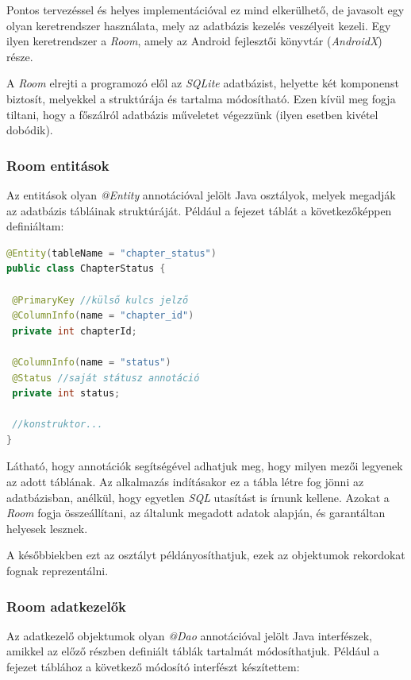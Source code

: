 \documentclass[12pt,a4paper]{article}
\begin{document}
	Pontos tervezéssel és helyes implementációval ez mind elkerülhető, de javasolt egy olyan keretrendszer használata, mely az adatbázis kezelés veszélyeit kezeli. Egy ilyen keretrendszer a \textit{Room}, amely az Android fejlesztői könyvtár (\textit{AndroidX}) része.
	
	A \textit{Room} elrejti a programozó elől az \textit{SQLite} adatbázist, helyette két komponenst biztosít, melyekkel a struktúrája és tartalma módosítható. Ezen kívül meg fogja tiltani, hogy a főszálról adatbázis műveletet végezzünk (ilyen esetben kivétel dobódik). 
	
	\subsubsection{Room entitások}
	
	Az entitások olyan \textit{@Entity} annotációval jelölt Java osztályok, melyek megadják az adatbázis tábláinak struktúráját. Például a fejezet táblát a következőképpen definiáltam:
	
	\begin{lstlisting}[language=Java]
@Entity(tableName = "chapter_status")
public class ChapterStatus {
	
 @PrimaryKey //külső kulcs jelző
 @ColumnInfo(name = "chapter_id")
 private int chapterId;
	
 @ColumnInfo(name = "status")
 @Status //saját státusz annotáció
 private int status;
 
 //konstruktor...
}
	\end{lstlisting}  
	
	Látható, hogy annotációk segítségével adhatjuk meg, hogy milyen mezői legyenek az adott táblának. Az alkalmazás indításakor ez a tábla létre fog jönni az adatbázisban, anélkül, hogy egyetlen \textit{SQL} utasítást is írnunk kellene. Azokat a \textit{Room} fogja összeállítani, az általunk megadott adatok alapján, és garantáltan helyesek lesznek.
	
	A későbbiekben ezt az osztályt példányosíthatjuk, ezek az objektumok rekordokat fognak reprezentálni.

	\subsubsection{Room adatkezelők}
	
	Az adatkezelő objektumok olyan \textit{@Dao} annotációval jelölt Java interfészek, amikkel az előző részben definiált táblák tartalmát módosíthatjuk. Például a fejezet táblához a következő módosító interfészt készítettem:
	
\end{document}
